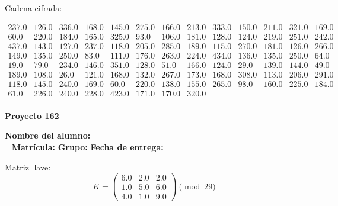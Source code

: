 \documentclass[12pt]{article}
\begin{document}
Cadena cifrada:
\begin{center}
$\begin{array}{lllllllllllll}
237.0 & 126.0 & 336.0 & 168.0 & 145.0 & 275.0 & 166.0 & 213.0 & 333.0 & 150.0 & 211.0 & 321.0 & 169.0\\
60.0 & 220.0 & 184.0 & 165.0 & 325.0 & 93.0 & 106.0 & 181.0 & 128.0 & 124.0 & 219.0 & 251.0 & 242.0\\
437.0 & 143.0 & 127.0 & 237.0 & 118.0 & 205.0 & 285.0 & 189.0 & 115.0 & 270.0 & 181.0 & 126.0 & 266.0\\
149.0 & 135.0 & 250.0 & 83.0 & 111.0 & 176.0 & 263.0 & 224.0 & 434.0 & 136.0 & 135.0 & 250.0 & 64.0\\
19.0 & 79.0 & 234.0 & 146.0 & 351.0 & 128.0 & 51.0 & 166.0 & 124.0 & 29.0 & 139.0 & 144.0 & 49.0\\
189.0 & 108.0 & 26.0 & 121.0 & 168.0 & 132.0 & 267.0 & 173.0 & 168.0 & 308.0 & 113.0 & 206.0 & 291.0\\
118.0 & 145.0 & 240.0 & 169.0 & 60.0 & 220.0 & 138.0 & 155.0 & 265.0 & 98.0 & 160.0 & 225.0 & 184.0\\
61.0 & 226.0 & 240.0 & 228.0 & 423.0 & 171.0 & 170.0 & 320.0\\
\end{array}$
\end{center}

\newpage


\textbf{Proyecto 162}

\textbf{Nombre del alumno:} \underline{\hspace{13cm}}\\\
\vspace{1cm}
\textbf{Matrícula:} \underline{\hspace{4cm}} \hspace{1cm}
\textbf{Grupo:} \underline{\hspace{2cm}}
\textbf{Fecha de entrega:} \underline{\hspace{2cm}}

\medskip

Matriz llave:
\[
K = \begin{pmatrix}
6.0 & 2.0 & 2.0\\
1.0 & 5.0 & 6.0\\
4.0 & 1.0 & 9.0
\end{pmatrix} \pmod{29}
\]
\end{document}
